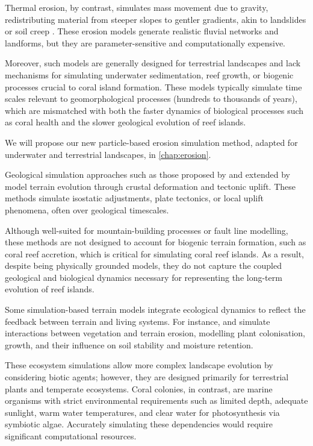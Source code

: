 Thermal erosion, by contrast, simulates mass movement due to gravity, redistributing material from steeper slopes to gentler gradients, akin to landslides or soil creep \cite{Benes2006}. These erosion models generate realistic fluvial networks and landforms, but they are parameter-sensitive and computationally expensive.

Moreover, such models are generally designed for terrestrial landscapes and lack mechanisms for simulating underwater sedimentation, reef growth, or biogenic processes crucial to coral island formation. These models typically simulate time scales relevant to geomorphological processes (hundreds to thousands of years), which are mismatched with both the faster dynamics of biological processes such as coral health and the slower geological evolution of reef islands.

We will propose our new particle-based erosion simulation method, adapted for underwater and terrestrial landscapes, in \cref{chap:erosion}.


Geological simulation approaches such as those proposed by \cite{Cordonnier2016, Cordonnier2017a} and extended by \cite{Schott2023} model terrain evolution through crustal deformation and tectonic uplift. These methods simulate isostatic adjustments, plate tectonics, or local uplift phenomena, often over geological timescales.

Although well-suited for mountain-building processes or fault line modelling, these methods are not designed to account for biogenic terrain formation, such as coral reef accretion, which is critical for simulating coral reef islands. As a result, despite being physically grounded models, they do not capture the coupled geological and biological dynamics necessary for representing the long-term evolution of reef islands.


Some simulation-based terrain models integrate ecological dynamics to reflect the feedback between terrain and living systems. For instance, \cite{Ecormier-Nocca2021} and \cite{Cordonnier2017b} simulate interactions between vegetation and terrain erosion, modelling plant colonisation, growth, and their influence on soil stability and moisture retention.

These ecosystem simulations allow more complex landscape evolution by considering biotic agents; however, they are designed primarily for terrestrial plants and temperate ecosystems. Coral colonies, in contrast, are marine organisms with strict environmental requirements such as limited depth, adequate sunlight, warm water temperatures, and clear water for photosynthesis via symbiotic algae. Accurately simulating these dependencies would require significant computational resources.

